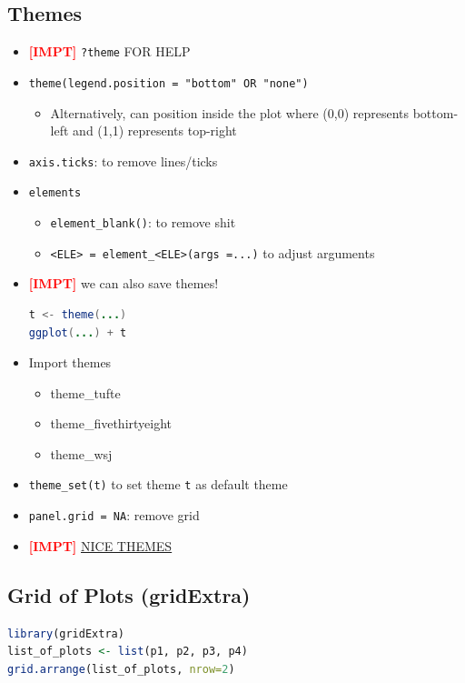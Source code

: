 \documentclass{article}
\newcommand{\impt}[0]{\textcolor{red}{\textbf{[IMPT] }}}
\begin{document}
\begin{multicols}{2}
\subsection{Themes}
\begin{itemize}
	\item \impt \texttt{?theme} FOR HELP
	\item \texttt{theme(legend.position = "bottom" OR "none")}
	\begin{itemize}
		\item Alternatively, can position inside the plot where (0,0) represents bottom-left and (1,1) represents top-right
	\end{itemize}
    \item \texttt{axis.ticks}: to remove lines/ticks
    \item \texttt{elements}
    \begin{itemize}
    	\item \texttt{element\_blank()}: to remove shit
    	\item \texttt{<ELE> = element\_<ELE>(args =...)} to adjust arguments
    \end{itemize}
    \item \impt we can also save themes!
    \begin{lstlisting}[language=Java]
t <- theme(...)
ggplot(...) + t
\end{lstlisting}
    \item Import themes
    \begin{itemize}
    	\item theme\_tufte
    	\item theme\_fivethirtyeight
    	\item theme\_wsj
    \end{itemize}
    \item \texttt{theme\_set(t)} to set theme \texttt{t} as default theme

    \item \texttt{panel.grid = NA}: remove grid
    \item \impt \href{https://exts.ggplot2.tidyverse.org/gallery/}{NICE THEMES}
\end{itemize}

\subsection{Grid of Plots (gridExtra)}
\begin{lstlisting}[language=R]
library(gridExtra)
list_of_plots <- list(p1, p2, p3, p4)
grid.arrange(list_of_plots, nrow=2)
\end{lstlisting}


\end{multicols}
\end{document}

